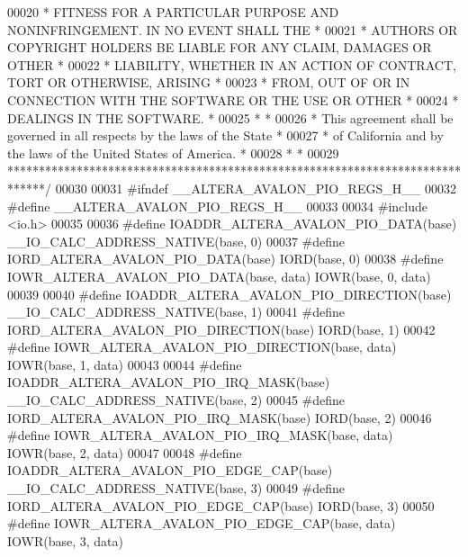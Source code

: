 \begin{DoxyCode}
00020 \textcolor{comment}{* FITNESS FOR A PARTICULAR PURPOSE AND NONINFRINGEMENT. IN NO EVENT SHALL THE *}
00021 \textcolor{comment}{* AUTHORS OR COPYRIGHT HOLDERS BE LIABLE FOR ANY CLAIM, DAMAGES OR OTHER      *}
00022 \textcolor{comment}{* LIABILITY, WHETHER IN AN ACTION OF CONTRACT, TORT OR OTHERWISE, ARISING     *}
00023 \textcolor{comment}{* FROM, OUT OF OR IN CONNECTION WITH THE SOFTWARE OR THE USE OR OTHER         *}
00024 \textcolor{comment}{* DEALINGS IN THE SOFTWARE.                                                   *}
00025 \textcolor{comment}{*                                                                             *}
00026 \textcolor{comment}{* This agreement shall be governed in all respects by the laws of the State   *}
00027 \textcolor{comment}{* of California and by the laws of the United States of America.              *}
00028 \textcolor{comment}{*                                                                             *}
00029 \textcolor{comment}{******************************************************************************/}
00030 
00031 \textcolor{preprocessor}{#ifndef \_\_ALTERA\_AVALON\_PIO\_REGS\_H\_\_}
00032 \textcolor{preprocessor}{#define \_\_ALTERA\_AVALON\_PIO\_REGS\_H\_\_}
00033 
00034 \textcolor{preprocessor}{#include <io.h>}
00035 
00036 \textcolor{preprocessor}{#define IOADDR\_ALTERA\_AVALON\_PIO\_DATA(base)           \_\_IO\_CALC\_ADDRESS\_NATIVE(base, 0)}
00037 \textcolor{preprocessor}{#define IORD\_ALTERA\_AVALON\_PIO\_DATA(base)             IORD(base, 0) }
00038 \textcolor{preprocessor}{#define IOWR\_ALTERA\_AVALON\_PIO\_DATA(base, data)       IOWR(base, 0, data)}
00039 
00040 \textcolor{preprocessor}{#define IOADDR\_ALTERA\_AVALON\_PIO\_DIRECTION(base)      \_\_IO\_CALC\_ADDRESS\_NATIVE(base, 1)}
00041 \textcolor{preprocessor}{#define IORD\_ALTERA\_AVALON\_PIO\_DIRECTION(base)        IORD(base, 1) }
00042 \textcolor{preprocessor}{#define IOWR\_ALTERA\_AVALON\_PIO\_DIRECTION(base, data)  IOWR(base, 1, data)}
00043 
00044 \textcolor{preprocessor}{#define IOADDR\_ALTERA\_AVALON\_PIO\_IRQ\_MASK(base)       \_\_IO\_CALC\_ADDRESS\_NATIVE(base, 2)}
00045 \textcolor{preprocessor}{#define IORD\_ALTERA\_AVALON\_PIO\_IRQ\_MASK(base)         IORD(base, 2) }
00046 \textcolor{preprocessor}{#define IOWR\_ALTERA\_AVALON\_PIO\_IRQ\_MASK(base, data)   IOWR(base, 2, data)}
00047 
00048 \textcolor{preprocessor}{#define IOADDR\_ALTERA\_AVALON\_PIO\_EDGE\_CAP(base)       \_\_IO\_CALC\_ADDRESS\_NATIVE(base, 3)}
00049 \textcolor{preprocessor}{#define IORD\_ALTERA\_AVALON\_PIO\_EDGE\_CAP(base)         IORD(base, 3) }
00050 \textcolor{preprocessor}{#define IOWR\_ALTERA\_AVALON\_PIO\_EDGE\_CAP(base, data)   IOWR(base, 3, data)}

\end{DoxyCode}
